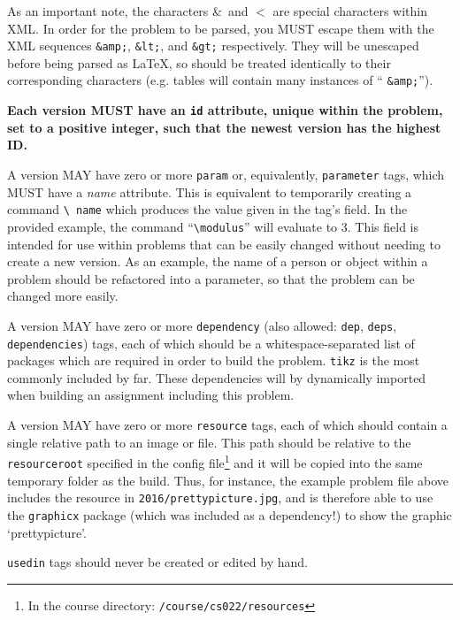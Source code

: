     As an important note, the characters \&\ and $<$ are special 
    characters within XML. In order for the problem to be parsed, you MUST 
    escape them with the XML sequences \texttt{\&amp;}, \texttt{\&lt;}, 
    and \texttt{\&gt;} respectively. They will be unescaped before being 
    parsed as \LaTeX, so should be treated identically to their 
    corresponding characters (e.g. tables will contain many instances of ``
    \texttt{\&amp;}'').
    
    \textbf{Each version MUST have an \texttt{id} attribute, unique within 
    the problem, set to a positive integer, such that the newest version 
    has the highest ID.}
    
    A version MAY have zero or more \texttt{param} or, equivalently, 
    \texttt{parameter} tags, which MUST have a \textit{name} attribute. This is 
    equivalent to temporarily creating a command \texttt{\textbackslash 
    name} which produces the value given in the tag's field. In the 
    provided example, the command ``\texttt{\textbackslash modulus}'' will 
    evaluate to 3. This field is intended for use within problems that can 
    be easily changed without needing to create a new version. As an 
    example, the name of a person or object within a problem should be 
    refactored into a parameter, so that the problem can be changed more easily.
    
    A version MAY have zero or more \texttt{dependency} (also allowed: 
    \texttt{dep}, \texttt{deps}, \texttt{dependencies}) tags, each of 
    which should be a whitespace-separated list of packages which are 
    required in order to build the problem. \texttt{tikz} is the most 
    commonly included by far. These dependencies will by dynamically 
    imported when building an assignment including this problem.
    
    A version MAY have zero or more \texttt{resource} tags, each of which
    should contain a single relative path to an image or file. This path
    should be relative to the \texttt{resourceroot} specified in the config
    file\footnote{In the course directory: \texttt{/course/cs022/resources}}
    and it will be copied into the same temporary folder as the build.
    Thus, for instance, the example problem file above includes the resource
    in \texttt{2016/prettypicture.jpg}, and is therefore able to use
    the \texttt{graphicx} package (which was included as a dependency!) to
    show the graphic `prettypicture'. 
    
    \texttt{usedin} tags should never be created or edited by hand.
  
